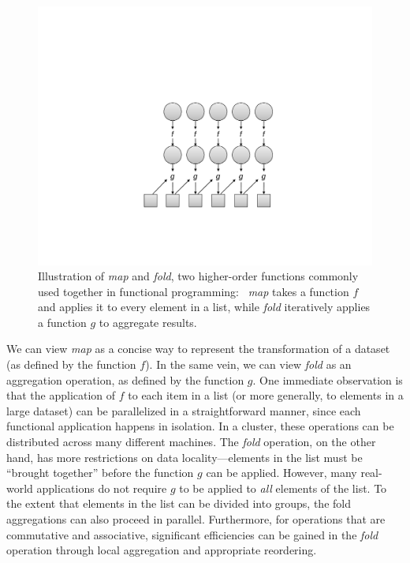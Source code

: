 \begin{figure}[t]
\begin{center}
\vspace{0.2cm}
\includegraphics[scale=0.6]{figures/fig-ch2-functional-programming.pdf}
\vspace{-0.3cm}
\end{center}
\caption{Illustration of {\it map} and {\it fold}, two higher-order
  functions commonly used together in functional programming:\ {\it
    map} takes a function $f$ and applies it to every element in a
    list, while {\it fold} iteratively applies a function $g$ to
    aggregate results.}
\label{figure:chapter2:functional}
\end{figure}

We can view {\it map} as a concise way to represent the transformation
of a dataset (as defined by the function $f$).  In the same vein, we
can view {\it fold} as an aggregation operation, as defined by the
function $g$.  One immediate observation is that the application of
$f$ to each item in a list (or more generally, to elements in a large
dataset) can be parallelized in a straightforward manner, since each
functional application happens in isolation.  In a cluster, these
operations can be distributed across many different machines.  The
{\it fold} operation, on the other hand, has more restrictions on data
locality---elements in the list must be ``brought together'' before
the function $g$ can be applied.  However, many real-world
applications do not require $g$ to be applied to {\it all} elements of
the list.  To the extent that elements in the list can be divided into
groups, the fold aggregations can also proceed in parallel.
Furthermore, for operations that are commutative and associative,
significant efficiencies can be gained in the {\it fold} operation
through local aggregation and appropriate reordering.


